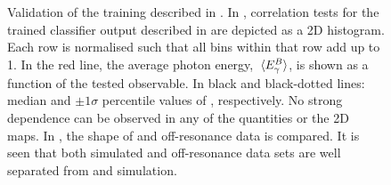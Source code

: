 \begin{figure}[htbp!]
    \centering
    \caption{\label{fig:bdt_validation} 
    Validation of the training described in .
    In , correlation tests for the trained classifier output described in  are depicted as a 2D histogram.
    Each row is normalised such that all bins within that row add up to 1.
    In the red line, the average photon energy, $\expval**{{E^B_{\gamma}}}$, is shown as a function of the tested observable.
    In black and black-dotted lines: median and $\pm 1 \sigma$ percentile values of \EB, respectively.
    No strong dependence can be observed in any of the quantities or the 2D maps.
    In , the shape of \epem\ra\qqbar and off-resonance data is compared.
    It is seen that both simulated and off-resonance data sets are well separated from \BB and \BtoXsgamma simulation.
    }
\end{figure}